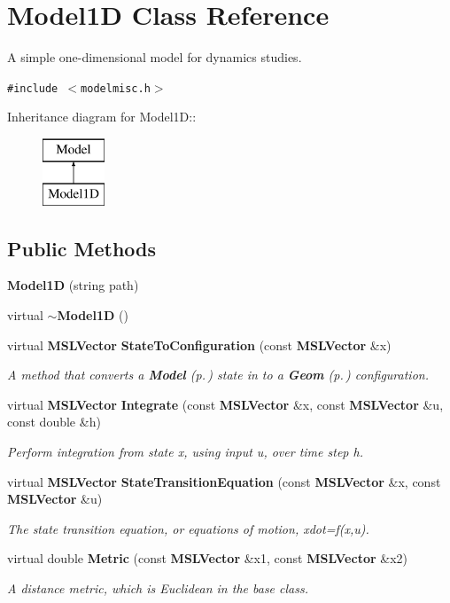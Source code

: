 \section{Model1D  Class Reference}
\label{classModel1D}
A simple one-dimensional model for dynamics studies. 


{\tt \#include $<$modelmisc.h$>$}

Inheritance diagram for Model1D::\begin{figure}[H]
\begin{center}
\leavevmode
\includegraphics[height=2cm]{classModel1D}
\end{center}
\end{figure}
\subsection*{Public Methods}
\begin{CompactItemize}
\item 
{\bf Model1D} (string path)
\item 
virtual {\bf $\sim$Model1D} ()
\item 
virtual {\bf MSLVector} {\bf State\-To\-Configuration} (const {\bf MSLVector} \&x)
\begin{CompactList}\small\item\em A method that converts a {\bf Model} {\rm (p.\,\pageref{classModel})} state in to a {\bf Geom} {\rm (p.\,\pageref{classGeom})} configuration.\item\end{CompactList}\item 
virtual {\bf MSLVector} {\bf Integrate} (const {\bf MSLVector} \&x, const {\bf MSLVector} \&u, const double \&h)
\begin{CompactList}\small\item\em Perform integration from state x, using input u, over time step h.\item\end{CompactList}\item 
virtual {\bf MSLVector} {\bf State\-Transition\-Equation} (const {\bf MSLVector} \&x, const {\bf MSLVector} \&u)
\begin{CompactList}\small\item\em The state transition equation, or equations of motion, xdot=f(x,u).\item\end{CompactList}\item 
virtual double {\bf Metric} (const {\bf MSLVector} \&x1, const {\bf MSLVector} \&x2)
\begin{CompactList}\small\item\em A distance metric, which is Euclidean in the base class.\item\end{CompactList}\end{CompactItemize}
